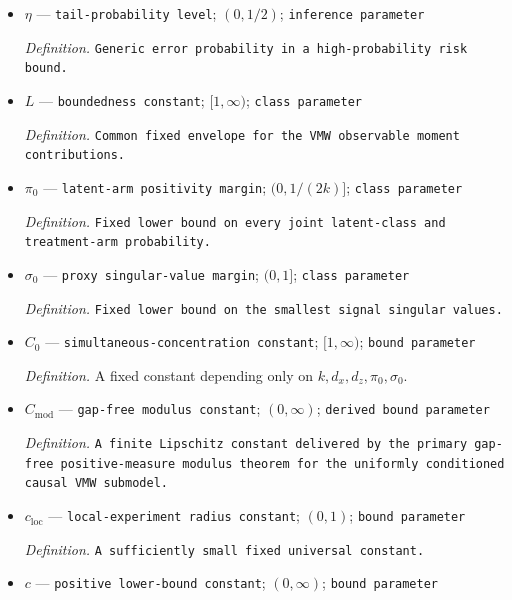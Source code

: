 \documentclass{article}
\begin{document}
\begin{itemize}
  \par\smallskip\noindent\emph{Definition.} \texttt{Nominal error probability for confidence sets.}
  \item \(\eta\) --- \texttt{tail-\allowbreak{}probability level}; \((0,1/2)\); \texttt{inference parameter}
  \par\smallskip\noindent\emph{Definition.} \texttt{Generic error probability in a high-\allowbreak{}probability risk bound.}
  \item \(L\) --- \texttt{boundedness constant}; \([1,\infty)\); \texttt{class parameter}
  \par\smallskip\noindent\emph{Definition.} \texttt{Common fixed envelope for the VMW observable moment contributions.}
  \item \(\pi_0\) --- \texttt{latent-\allowbreak{}arm positivity margin}; \((0,1/(2k)]\); \texttt{class parameter}
  \par\smallskip\noindent\emph{Definition.} \texttt{Fixed lower bound on every joint latent-\allowbreak{}class and treatment-\allowbreak{}arm probability.}
  \item \(\sigma_0\) --- \texttt{proxy singular-\allowbreak{}value margin}; \((0,1]\); \texttt{class parameter}
  \par\smallskip\noindent\emph{Definition.} \texttt{Fixed lower bound on the smallest signal singular values.}
  \item \(C_0\) --- \texttt{simultaneous-\allowbreak{}concentration constant}; \([1,\infty)\); \texttt{bound parameter}
  \par\smallskip\noindent\emph{Definition.} A fixed constant depending only on \(k,d_x,d_z,\pi_0,\sigma_0\).
  \item \(C_{\mathrm{mod}}\) --- \texttt{gap-\allowbreak{}free modulus constant}; \((0,\infty)\); \texttt{derived bound parameter}
  \par\smallskip\noindent\emph{Definition.} \texttt{A finite Lipschitz constant delivered by the primary gap-\allowbreak{}free positive-\allowbreak{}measure modulus theorem for the uniformly conditioned causal VMW submodel.}
  \item \(c_{\mathrm{loc}}\) --- \texttt{local-\allowbreak{}experiment radius constant}; \((0,1)\); \texttt{bound parameter}
  \par\smallskip\noindent\emph{Definition.} \texttt{A sufficiently small fixed universal constant.}
  \item \(c\) --- \texttt{positive lower-\allowbreak{}bound constant}; \((0,\infty)\); \texttt{bound parameter}

\end{itemize}
\end{document}
